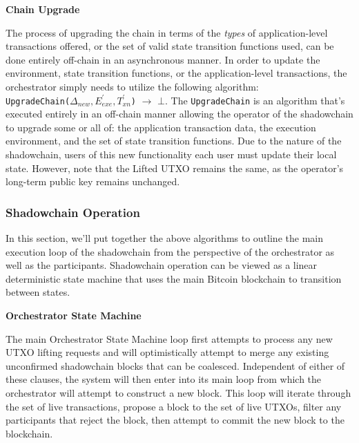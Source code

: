 \documentclass[10pt,a4paper]{article}
\theoremstyle{definition}
\begin{document}



\begin{center}
    \textbf{Chain Upgrade}
\end{center}

The process of upgrading the chain in terms of the \emph{types} of
application-level transactions offered, or the set of valid state transition
functions used, can be done entirely off-chain in an asynchronous manner. In
order to update the environment, state transition functions, or the
application-level transactions, the orchestrator simply needs to utilize the
following algorithm: \\

\texttt{UpgradeChain($\Delta_{new}, E_{exe}^\prime, T_{xn}^\prime$)}
$\rightarrow$ $\bot$. The \texttt{UpgradeChain} is an algorithm that's executed
entirely in an off-chain manner allowing the operator of the shadowchain to
upgrade some or all of: the application transaction data, the execution
environment, and the set of state transition functions. Due to the nature of
the shadowchain, users of this new functionality each user must update their
local state. However, note that the Lifted UTXO remains the same, as the
operator's long-term public key remains unchanged.

\subsubsection{Shadowchain Operation}

In this section, we'll put together the above algorithms to outline the main
execution loop of the shadowchain from the perspective of the orchestrator as
well as the participants. Shadowchain operation can be viewed as a linear
deterministic state machine that uses the main Bitcoin blockchain to transition
between states.


\begin{center}
    \textbf{Orchestrator State Machine}
\end{center}

The main Orchestrator State Machine loop first attempts to process any new UTXO
lifting requests and will optimistically attempt to merge any existing
unconfirmed shadowchain blocks that can be coalesced. Independent of either of
these clauses, the system will then enter into its main loop from which the
orchestrator will attempt to construct a new block. This loop will iterate
through the set of live transactions, propose a block to the set of live UTXOs,
filter any participants that reject the block, then attempt to commit the new
block to the blockchain.
\end{document}
